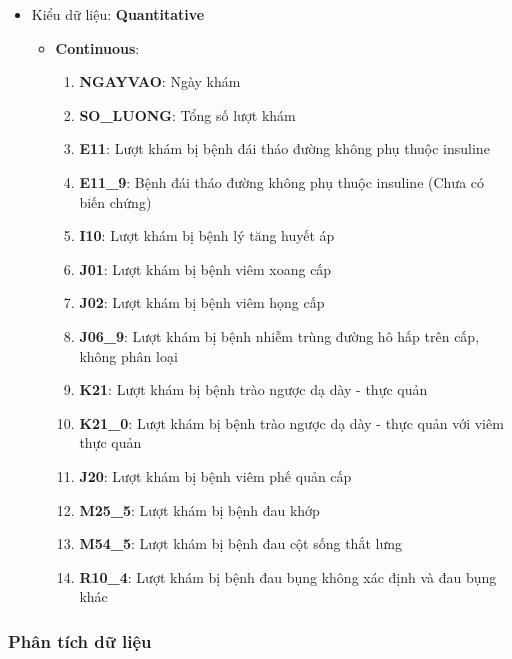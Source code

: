     \begin{itemize}
        \item Kiểu dữ liệu: \textbf{Quantitative} 
        \begin{itemize}
            \item \textbf{Continuous}:
             \begin{enumerate}[resume]
                \item \textbf{NGAYVAO}: Ngày khám

                \item \textbf{SO\_LUONG}: Tổng số lượt khám

                \item \textbf{E11}: Lượt khám bị bệnh đái tháo đường không phụ thuộc insuline
                \item \textbf{E11\_9}:	Bệnh đái tháo đường không phụ thuộc insuline (Chưa có biến chứng)
                \item \textbf{I10}: Lượt khám bị bệnh lý tăng huyết áp
                \item \textbf{J01}: Lượt khám bị bệnh viêm xoang cấp
                \item \textbf{J02}: Lượt khám bị bệnh viêm họng cấp
                \item \textbf{J06\_9}: Lượt khám bị bệnh nhiễm trùng đường hô hấp trên cấp, không phân loại
                \item \textbf{K21}: Lượt khám bị bệnh trào ngược dạ dày - thực quản
                \item \textbf{K21\_0}: Lượt khám bị bệnh trào ngược dạ dày - thực quản với viêm thực quản
                \item \textbf{J20}: Lượt khám bị bệnh viêm phế quản cấp
                \item \textbf{M25\_5}: Lượt khám bị bệnh đau khớp
                \item \textbf{M54\_5}: Lượt khám bị bệnh đau cột sống thắt lưng
                \item \textbf{R10\_4}: Lượt khám bị bệnh đau bụng không xác định và đau bụng khác
            \end{enumerate}

        \end{itemize}

    \end{itemize}

\subsubsection{Phân tích dữ liệu}
